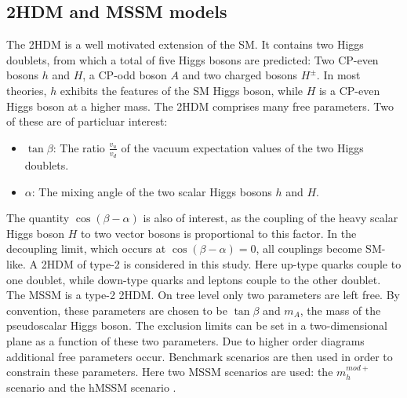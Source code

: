 \subsection*{2HDM and MSSM models}
The 2HDM is a well motivated extension of the SM. It contains two Higgs doublets, from which a total of five Higgs bosons are predicted: Two CP-even bosons $h$ and $H$, a CP-odd boson $A$ and two charged bosons $H^\pm$. In most theories, $h$ exhibits the features of the SM Higgs boson, while $H$ is a CP-even Higgs boson at a higher mass. The 2HDM comprises many free parameters. Two of these are of particluar interest:
\begin{itemize}
\item $\tan\beta$: The ratio $\frac{v_u}{v_d}$ of the vacuum expectation values of the two Higgs doublets.
\item $\alpha$: The mixing angle of the two scalar Higgs bosons $h$ and $H$.
\end{itemize}
The quantity $\cos(\beta-\alpha)$ is also of interest, as the coupling of the heavy scalar Higgs boson $H$ to two vector bosons is proportional to this factor. In the decoupling limit, which occurs at $\cos(\beta-\alpha)=0$, all couplings become SM-like.
A 2HDM of type-2 is considered in this study. Here up-type quarks couple to one doublet, while down-type quarks and leptons couple to the other doublet.\\ 
\newline
The MSSM is a type-2 2HDM. On tree level only two parameters are left free. By convention, these parameters are chosen to be $\tan\beta$ and $m_{A}$, the mass of the pseudoscalar Higgs boson. The exclusion limits can be set in a two-dimensional plane as a function of these two parameters. Due to higher order diagrams additional free parameters occur. Benchmark scenarios are then used in order to constrain these parameters. Here two MSSM scenarios are used: the $m_{h}^{mod+}$ scenario and the hMSSM scenario \cite{Gori:2130983}.\\
\newline
